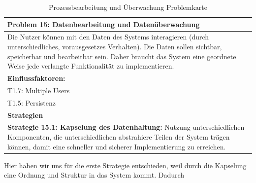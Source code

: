 \documentclass[enabledeprecatedfontcommands,fontsize=12pt,paper=a4,twoside]{scrartcl}
\begin{document}
\begin{table}[H]
    \centering
    \begin{tabular}{|p{15cm}|}
    \hline
          \textbf{Problem 15:} Datenbearbeitung und Datenüberwachung %
          \\ \hline 
Die Nutzer können mit den Daten des Systems interagieren (durch unterschiedliches, vorausgesetzes Verhalten). Die Daten sollen sichtbar, speicherbar und bearbeitbar sein. Daher braucht das System eine geordnete Weise jede verlangte Funktionalität zu implementieren.
          \\ \hline
          \textbf{Einflussfaktoren: } \\
          T1.7: Multiple Users\\
	      T1.5: Persistenz\\
          \hline
          \textbf{Strategien} \\ \hline 
          
            \textbf{Strategie 15.1: Kapselung des Datenhaltung:} Nutzung unterschiedlichen Komponenten, die unterschiedlichen abstrahiere Teilen der System trägen können, damit eine schneller und sicherer Implementierung  zu erreichen. 
		{}          
           \label{strategie:15.1} 
            \\ \hline
    \end{tabular}
    \caption{Prozessbearbeitung und Überwachung Problemkarte}
    \label{tab:ProblemKarte15}
\end{table}
Hier haben wir uns für die erste Strategie entschieden, weil durch die Kapselung eine Ordnung und Struktur in das System kommt. Dadurch \\%
\end{document}
